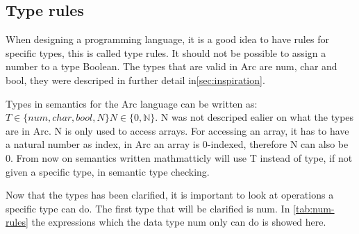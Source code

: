 \subsection{Type rules}\label{subsec:typerules}





When designing a programming language, it is a good idea to have rules for specific types, this is called type rules. It should not be possible to assign a number to a type Boolean. 
The types that are valid in Arc are num, char and bool, they were descriped in further detail in\ref*{sec:inspiration}.

Types in semantics for the Arc language can be written as:
$T \in \{num, char, bool, N\} N \in \{ 0,\mathbb{N}\}$.
N was not descriped ealier on what the types are in Arc. 
N is only used to access arrays. 
For accessing an array, it has to have a natural number as index, in Arc an array is 0-indexed, therefore N can also be 0.  
From now on semantics written mathmatticly will use T instead of type, if not given a specific type, in semantic type checking.

Now that the types has been clarified, it is important to look at operations a specific type can do.
The first type that will be clarified is num.
In \ref{tab:num-rules} the expressions which the data type num only can do is showed here.

